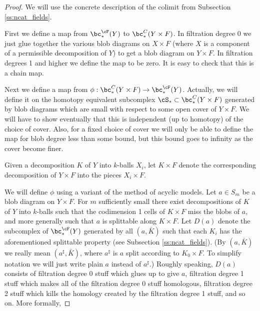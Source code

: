 \begin{proof}
We will use the concrete description of the colimit from Subsection \ref{ss:ncat_fields}.

First we define a map from $\bc_*^\cF(Y)$ to $\bc_*^C(Y\times F)$.
In filtration degree 0 we just glue together the various blob diagrams on $X\times F$
(where $X$ is a component of a permissible decomposition of $Y$) to get a blob diagram on
$Y\times F$.
In filtration degrees 1 and higher we define the map to be zero.
It is easy to check that this is a chain map.

Next we define a map from $\phi: \bc_*^C(Y\times F) \to \bc_*^\cF(Y)$.
Actually, we will define it on the homotopy equivalent subcomplex
$\cS_* \sub \bc_*^C(Y\times F)$ generated by blob diagrams which are small with 
respect to some open cover
of $Y\times F$.
We will have to show eventually that this is independent (up to homotopy) of the choice of cover.
Also, for a fixed choice of cover we will only be able to define the map for blob degree less than
some bound, but this bound goes to infinity as the cover become finer.

Given a decomposition $K$ of $Y$ into $k$-balls $X_i$, let $K\times F$ denote the corresponding
decomposition of $Y\times F$ into the pieces $X_i\times F$.


We will define $\phi$ using a variant of the method of acyclic models.
Let $a\in S_m$ be a blob diagram on $Y\times F$.
For $m$ sufficiently small there exist decompositions of $K$ of $Y$ into $k$-balls such that the
codimension 1 cells of $K\times F$ miss the blobs of $a$, and more generally such that $a$ is splittable along $K\times F$.
Let $D(a)$ denote the subcomplex of $\bc_*^\cF(Y)$ generated by all $(a, \bar{K})$
such that each $K_i$ has the aforementioned splittable property
(see Subsection \ref{ss:ncat_fields}).
(By $(a, \bar{K})$ we really mean $(a^\sharp, \bar{K})$, where $a^\sharp$ is 
$a$ split according to $K_0\times F$.
To simplify notation we will just write plain $a$ instead of $a^\sharp$.)
Roughly speaking, $D(a)$ consists of filtration degree 0 stuff which glues up to give
$a$, filtration degree 1 stuff which makes all of the filtration degree 0 stuff homologous, 
filtration degree 2 stuff which kills the homology created by the 
filtration degree 1 stuff, and so on.
More formally,
 

\end{proof}
